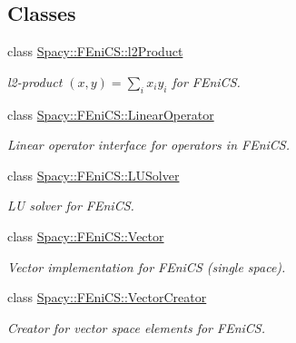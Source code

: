 \subsection*{Classes}
\begin{DoxyCompactItemize}
\item 
class \hyperlink{classSpacy_1_1FEniCS_1_1l2Product}{Spacy\-::\-F\-Eni\-C\-S\-::l2\-Product}
\begin{DoxyCompactList}\small\item\em l2-\/product $(x,y) = \sum_i x_i y_i $ for F\-Eni\-C\-S. \end{DoxyCompactList}\item 
class \hyperlink{classSpacy_1_1FEniCS_1_1LinearOperator}{Spacy\-::\-F\-Eni\-C\-S\-::\-Linear\-Operator}
\begin{DoxyCompactList}\small\item\em Linear operator interface for operators in F\-Eni\-C\-S. \end{DoxyCompactList}\item 
class \hyperlink{classSpacy_1_1FEniCS_1_1LUSolver}{Spacy\-::\-F\-Eni\-C\-S\-::\-L\-U\-Solver}
\begin{DoxyCompactList}\small\item\em L\-U solver for F\-Eni\-C\-S. \end{DoxyCompactList}\item 
class \hyperlink{classSpacy_1_1FEniCS_1_1Vector}{Spacy\-::\-F\-Eni\-C\-S\-::\-Vector}
\begin{DoxyCompactList}\small\item\em Vector implementation for F\-Eni\-C\-S (single space). \end{DoxyCompactList}\item 
class \hyperlink{classSpacy_1_1FEniCS_1_1VectorCreator}{Spacy\-::\-F\-Eni\-C\-S\-::\-Vector\-Creator}
\begin{DoxyCompactList}\small\item\em Creator for vector space elements for F\-Eni\-C\-S. \end{DoxyCompactList}\end{DoxyCompactItemize}
